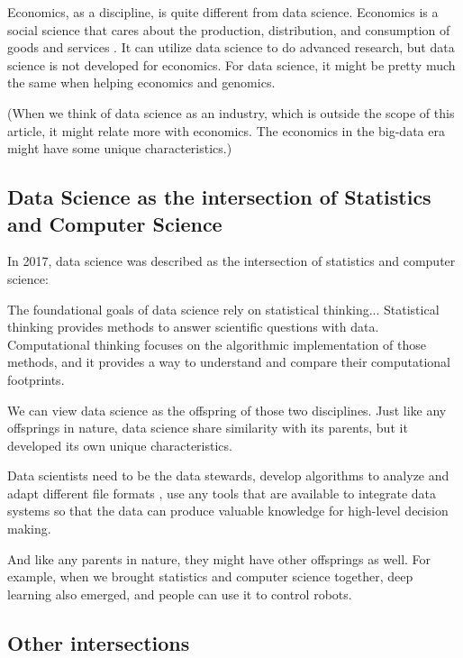 Economics, as a discipline, is quite different from data science.
Economics is a social science that cares about the production, distribution, and consumption of goods and services \cite{webster_economics}.
It can utilize data science to do advanced research, but data science is not developed for economics.
For data science, it might be pretty much the same when helping economics and genomics.

(When we think of data science as an industry, which is outside the scope of this article, it might relate more with economics. The economics in the big-data era might have some unique characteristics.)

\subsection*{Data Science as the intersection of Statistics and Computer Science}

In 2017, data science was described as the intersection of statistics and computer science:

\begin{displayquote}
The foundational goals of data science rely on statistical thinking...
Statistical thinking provides methods to answer scientific questions with data.
Computational thinking focuses on the algorithmic implementation of those methods, and it provides a way to understand and compare their computational footprints.
\cite{blei_science_2017}
\end{displayquote}

We can view data science as the offspring of those two disciplines.
Just like any offsprings in nature, data science share similarity with its parents, but it developed its own unique characteristics.

Data scientists need to be the data stewards, develop algorithms to analyze and adapt different file formats \cite{mattmann_vision_2013}, use any tools that are available to integrate data systems so that the data can produce valuable knowledge for high-level decision making.

And like any parents in nature, they might have other offsprings as well. 
For example, when we brought statistics and computer science together, deep learning also emerged, and people can use it to control robots.

\subsection*{Other intersections}

